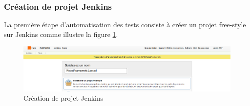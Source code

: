 \subsubsection{Création de projet Jenkins}
La première étape d'automatisation des tests consiste à créer un projet free-style sur Jenkins comme illustre la figure \ref{fig:creation-projet}.
\begin{figure}[H]
	\centering
	\includegraphics[width=0.9\linewidth]{"img/jenkins/creation projet"}
	\caption[Création de projet Jenkins]{Création de projet Jenkins}
	\label{fig:creation-projet}
\end{figure}

